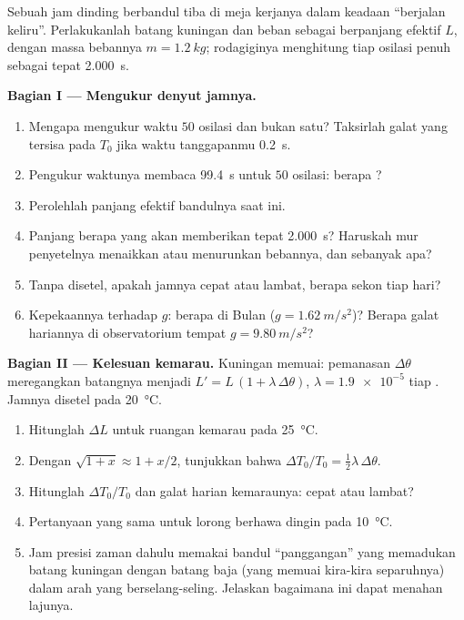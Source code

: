 \begin{problem}
\label{pb:g12:oscillators-and-time:1}
Sebuah jam dinding berbandul tiba di meja kerjanya dalam keadaan ``berjalan
keliru''. Perlakukanlah batang kuningan dan beban  sebagai  berpanjang efektif $L$, dengan massa bebannya $m = \qty{1.2}{kg}$;
rodagiginya menghitung tiap osilasi penuh sebagai tepat \qty{2.000}{s}.

\medskip
\noindent\textbf{Bagian I --- Mengukur denyut jamnya.}
\begin{enumerate}
  \item Mengapa mengukur waktu $50$ osilasi dan bukan satu? Taksirlah galat
        yang tersisa pada $T_0$ jika waktu tanggapanmu \qty{0.2}{s}.
  \item Pengukur waktunya membaca \qty{99.4}{s} untuk $50$ osilasi: berapa ?
  \item Perolehlah panjang efektif bandulnya saat ini.
  \item Panjang berapa yang akan memberikan tepat \qty{2.000}{s}? Haruskah
        mur penyetelnya menaikkan atau menurunkan bebannya, dan sebanyak apa?
  \item Tanpa disetel, apakah jamnya cepat atau lambat, berapa sekon tiap hari?
  \item Kepekaannya terhadap $g$: berapa  di Bulan
        ($g = \qty{1.62}{m/s^2}$)? Berapa galat hariannya di observatorium
        tempat $g = \qty{9.80}{m/s^2}$?
\end{enumerate}

\medskip
\noindent\textbf{Bagian II --- Kelesuan kemarau.} Kuningan memuai: pemanasan
$\Delta\theta$ meregangkan batangnya menjadi $L' = L\,(1 + \lambda\,
\Delta\theta)$, $\lambda = \num{1.9e-5}$ tiap . Jamnya
disetel pada \qty{20}{\celsius}.
\begin{enumerate}[resume]
  \item Hitunglah $\Delta L$ untuk ruangan kemarau pada \qty{25}{\celsius}.
  \item Dengan $\sqrt{1+x} \approx 1 + x/2$, tunjukkan bahwa
        $\Delta T_0 / T_0 = \tfrac12 \lambda\, \Delta\theta$.
  \item Hitunglah $\Delta T_0/T_0$ dan galat harian kemaraunya: cepat atau lambat?
  \item Pertanyaan yang sama untuk lorong berhawa dingin pada \qty{10}{\celsius}.
  \item Jam presisi zaman dahulu memakai bandul ``panggangan'' yang memadukan
        batang kuningan dengan batang baja (yang memuai kira-kira separuhnya)
        dalam arah yang berselang-seling. Jelaskan bagaimana ini dapat menahan lajunya.
\end{enumerate}


\end{problem}
